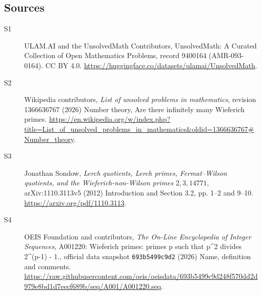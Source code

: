 \documentclass[11pt]{article}
\begin{document}
\subsection{Sources}
\begin{description}
\item[\hypertarget{source:9400164:1}{S1}] ULAM.AI and the UnsolvedMath Contributors, UnsolvedMath: A Curated Collection of Open Mathematics Problems, record 9400164 (AMR-093-0164). CC BY 4.0. \url{https://huggingface.co/datasets/ulamai/UnsolvedMath}.
\item[\hypertarget{source:9400164:2}{S2}] Wikipedia contributors, \emph{List of unsolved problems in mathematics}, revision 1366636767 (2026) Number theory, Are there infinitely many Wieferich primes. \url{https://en.wikipedia.org/w/index.php?title=List_of_unsolved_problems_in_mathematics&oldid=1366636767#Number_theory}.
\item[\hypertarget{source:9400164:3}{S3}] Jonathan Sondow, \emph{Lerch quotients, Lerch primes, Fermat--Wilson quotients, and the Wieferich-non-Wilson primes $2,3,14771$}, arXiv:1110.3113v5 (2012) Introduction and Section 3.2, pp. 1--2 and 9--10. \url{https://arxiv.org/pdf/1110.3113}.
\item[\hypertarget{source:9400164:4}{S4}] OEIS Foundation and contributors, \emph{The On-Line Encyclopedia of Integer Sequences}, A001220: Wieferich primes: primes p such that p\textasciicircum{}2 divides 2\textasciicircum{}(p-1) - 1., official data snapshot \texttt{693b5499c9d2} (2026) Name, definition and comments. \url{https://raw.githubusercontent.com/oeis/oeisdata/693b5499c9d248f570dd2d979e8bd1d7eecf689b/seq/A001/A001220.seq}.
\end{description}
\label{end:9400164}
\end{document}
